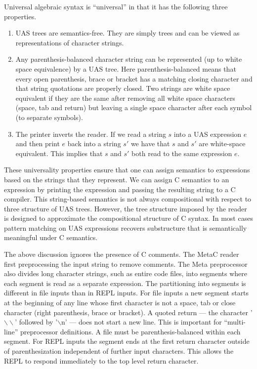 \documentclass{article}
\begin{document}
\noindent Universal algebraic syntax is ``universal'' in that it has the following three properties.

\begin{enumerate}
\item UAS trees are semantics-free.  They are simply trees and can be viewed as representations of character strings.

\item Any parenthesis-balanced character string can be represented (up to white space equivalence) by a UAS tree. Here parenthesis-balanced means that every open parenthesis, brace or bracket has a matching closing character and that string quotations
  are properly closed.  Two strings are white space equivalent if they are the same after removing all white space characters (space, tab and return) but leaving a single space character after each symbol (to separate symbols).

\item The printer inverts the reader. If we read a string $s$ into a UAS expression $e$ and then print $e$ back into a string $s'$ we have that $s$ and $s'$ are white-space equivalent.  This implies that $s$ and $s'$ both read to the same expression $e$.
\end{enumerate}

These universality properties ensure that one can assign semantics to expressions based on the strings that they represent.  We can assign C semantics to an expression by printing the expression and passing the resulting string to a C compiler.
This string-based semantics is not always compositional with respect to three structure of UAS trees.  However, the tree structure imposed by the reader is designed to approximate the compositional structure of C syntax.  In most cases
pattern matching on UAS expressions recovers substructure that is semantically meaningful under C semantics.

The above discussion ignores the presence of C comments. The MetaC reader first preprocessing the input string to remove comments.
The Meta preprocessor also divides long character strings, such as entire code files, into segments where each segment is read as a separate expression.
The partitioning into segments is different in file inputs than in REPL inputs.
For file inputs a new segment starts at the beginning of any line whose first character is not a space, tab or close character (right parenthesis, brace or bracket).
A quoted return --- the character '$\backslash\backslash$' followed by '$\backslash$n' --- does not start a new line.  This is important for ``multi-line'' preprocessor definitions.
A file must be parenthesis-balanced within each segment.
For REPL inputs the segment ends at the first return character outside of parenthesization independent of further input characters.  This allows the REPL to respond immediately
to the top level return character.
\end{document}
